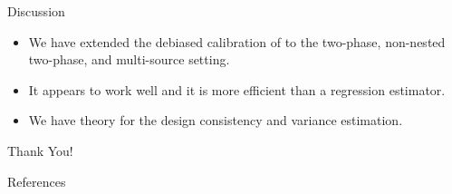 \documentclass{beamer} %
\begin{document}
%
%
%
%  
%

\begin{frame}{Discussion}

  \begin{itemize}
    \item We have extended the debiased calibration of \cite{kwon2024debiased}
      to the two-phase, non-nested two-phase, and multi-source setting.
    \item It appears to work well and it is more efficient than a regression 
      estimator.
    \item We have theory for the design consistency and variance estimation.
  \end{itemize}

\end{frame}

\begin{frame}{}

  \begin{center}
    {\Large Thank You!}
  \end{center}

\end{frame}

\begin{frame}[allowframebreaks]{References}

\printbibliography

\end{frame}
\end{document}
